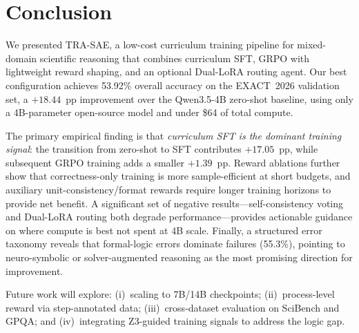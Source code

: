 \documentclass[cmc,journal,article,submit,moreauthors,pdftex]{Definitions/tsp}
\newcommand{\modelname}{\textsc{TRA-SAE}}
\newcommand{\basemodelname}{Qwen3.5-4B}
\newcommand{\dataset}{EXACT~2026}
\begin{document}
\section{Conclusion}\label{sec:conclusion}

We presented \modelname{}, a low-cost curriculum training pipeline for
mixed-domain scientific reasoning that combines curriculum SFT, GRPO with
lightweight reward shaping, and an optional Dual-LoRA routing agent.
Our best configuration achieves 53.92\% overall accuracy on the
\dataset{} validation set, a $+18.44$~pp improvement over the
\basemodelname{} zero-shot baseline, using only a 4B-parameter
open-source model and under \$64 of total compute.

The primary empirical finding is that \emph{curriculum SFT is the
dominant training signal}: the transition from zero-shot to SFT
contributes $+17.05$~pp, while subsequent GRPO training adds a smaller
$+1.39$~pp.
Reward ablations further show that correctness-only training is more
sample-efficient at short budgets, and auxiliary unit-consistency/format
rewards require longer training horizons to provide net benefit.
A significant set of negative results---self-consistency voting and
Dual-LoRA routing both degrade performance---provides actionable guidance
on where compute is best not spent at 4B scale.
Finally, a structured error taxonomy reveals that formal-logic errors
dominate failures (55.3\%), pointing to neuro-symbolic or
solver-augmented reasoning as the most promising direction for
improvement.

Future work will explore: (i)~scaling to 7B/14B checkpoints;
(ii)~process-level reward via step-annotated data;
(iii)~cross-dataset evaluation on SciBench and GPQA; and
(iv)~integrating Z3-guided training signals to address the logic gap.




\end{document}

